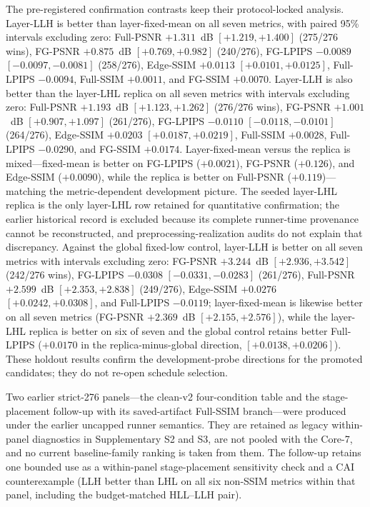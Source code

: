 \documentclass[times,twocolumn,final]{elsarticle}
\begin{document}
The pre-registered confirmation contrasts keep their protocol-locked analysis. Layer-LLH is better than layer-fixed-mean on all seven metrics, with paired 95\% intervals excluding zero: Full-PSNR $+1.311$~dB $[+1.219,+1.400]$ (275/276 wins), FG-PSNR $+0.875$~dB $[+0.769,+0.982]$ (240/276), FG-LPIPS $-0.0089$ $[-0.0097,-0.0081]$ (258/276), Edge-SSIM $+0.0113$ $[+0.0101,+0.0125]$, Full-LPIPS $-0.0094$, Full-SSIM $+0.0011$, and FG-SSIM $+0.0070$. Layer-LLH is also better than the layer-LHL replica on all seven metrics with intervals excluding zero: Full-PSNR $+1.193$~dB $[+1.123,+1.262]$ (276/276 wins), FG-PSNR $+1.001$~dB $[+0.907,+1.097]$ (261/276), FG-LPIPS $-0.0110$ $[-0.0118,-0.0101]$ (264/276), Edge-SSIM $+0.0203$ $[+0.0187,+0.0219]$, Full-SSIM $+0.0028$, Full-LPIPS $-0.0290$, and FG-SSIM $+0.0174$. Layer-fixed-mean versus the replica is mixed---fixed-mean is better on FG-LPIPS ($+0.0021$), FG-PSNR ($+0.126$), and Edge-SSIM ($+0.0090$), while the replica is better on Full-PSNR ($+0.119$)---matching the metric-dependent development picture. The seeded layer-LHL replica is the only layer-LHL row retained for quantitative confirmation; the earlier historical record is excluded because its complete runner-time provenance cannot be reconstructed, and preprocessing-realization audits do not explain that discrepancy. Against the global fixed-low control, layer-LLH is better on all seven metrics with intervals excluding zero: FG-PSNR $+3.244$~dB $[+2.936,+3.542]$ (242/276 wins), FG-LPIPS $-0.0308$ $[-0.0331,-0.0283]$ (261/276), Full-PSNR $+2.599$~dB $[+2.353,+2.838]$ (249/276), Edge-SSIM $+0.0276$ $[+0.0242,+0.0308]$, and Full-LPIPS $-0.0119$; layer-fixed-mean is likewise better on all seven metrics (FG-PSNR $+2.369$~dB $[+2.155,+2.576]$), while the layer-LHL replica is better on six of seven and the global control retains better Full-LPIPS ($+0.0170$ in the replica-minus-global direction, $[+0.0138,+0.0206]$). These holdout results confirm the development-probe directions for the promoted candidates; they do not re-open schedule selection.

Two earlier strict-276 panels---the clean-v2 four-condition table and the stage-placement follow-up with its saved-artifact Full-SSIM branch---were produced under the earlier uncapped runner semantics. They are retained as legacy within-panel diagnostics in Supplementary S2 and S3, are not pooled with the Core-7, and no current baseline-family ranking is taken from them. The follow-up retains one bounded use as a within-panel stage-placement sensitivity check and a CAI counterexample (LLH better than LHL on all six non-SSIM metrics within that panel, including the budget-matched HLL--LLH pair).
\end{document}
